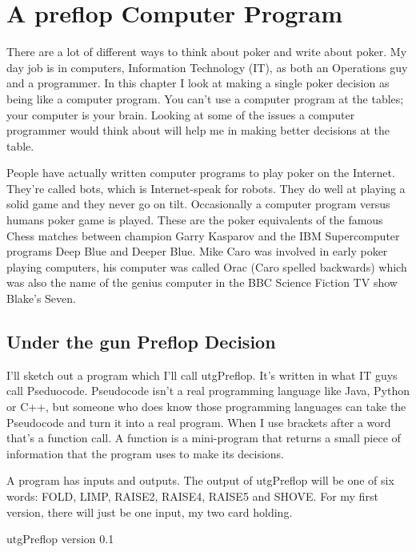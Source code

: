 \chapter{A preflop Computer Program}


There are a lot of different ways to think about poker and write
about poker. My day job is in computers, Information Technology (IT),
as both an Operations guy and a programmer. In this chapter I look at
making a single poker decision as being like a computer program. You
can't use a computer program at the tables; your computer is your
brain. Looking at some of the issues a computer programmer would think
about will help me in making better decisions at the table.

People have actually written computer programs to play poker on
the Internet. They're called bots, which is Internet-speak for
robots. They do well at playing a solid game and they never go on tilt.
Occasionally a computer program versus humans poker game is played.
These are the poker equivalents of the famous Chess matches between
champion Garry Kasparov and the IBM Supercomputer programs Deep Blue
and Deeper Blue. Mike Caro was involved in early poker playing
computers, his computer was called Orac (Caro spelled backwards) which
was also the name of the genius computer in the BBC Science Fiction TV
show Blake's Seven.

\section*{Under the gun Preflop Decision}

I'll sketch out a program which I'll call utgPreflop. It's written
in what IT guys call Pseduocode. Pseudocode isn't a real programming
language like Java, Python or C++, but someone who does know those
programming languages can take the Pseudocode and turn it into a real
program. When I use brackets after a word that's a function call.
A function is a mini-program that returns a small piece of information
that the program uses to make its decisions.

A program has inputs and outputs. The output of utgPreflop will
be one of six words: FOLD, LIMP, RAISE2, RAISE4, RAISE5 and SHOVE.
For my first version, there will just be one input, my two card
holding.

utgPreflop version 0.1


